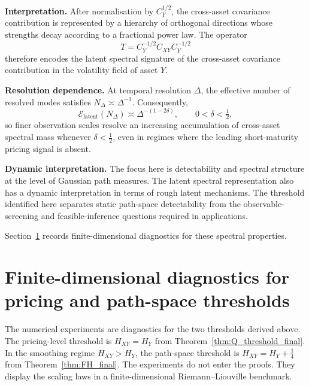 \documentclass[11pt,a4paper]{amsart}
\theoremstyle{plain}
\theoremstyle{definition}
\theoremstyle{remark}
\begin{document}
\medskip

\noindent
\textbf{Interpretation.}
After normalisation by $C_Y^{1/2}$, the cross-asset covariance contribution is represented by a hierarchy of orthogonal directions whose strengths decay according to a fractional power law. The operator
\[
T = C_Y^{-1/2} C_{XY} C_Y^{-1/2}
\]
therefore encodes the latent spectral signature of the cross-asset covariance contribution in the
volatility field of asset $Y$.

\medskip

\noindent
\textbf{Resolution dependence.}
At temporal resolution $\Delta$, the effective number of resolved modes satisfies $N_\Delta\asymp \Delta^{-1}$. Consequently,
\[
\mathcal E_{\mathrm{latent}}(N_\Delta)\asymp \Delta^{-(1-2\delta)},
\qquad 0<\delta<\tfrac12,
\]
so finer observation scales resolve an increasing accumulation of cross-asset spectral mass whenever
$\delta<\tfrac12$, even in regimes where the leading short-maturity pricing signal is absent.

\medskip

\noindent
\textbf{Dynamic interpretation.}
The focus here is detectability and spectral structure at the level of Gaussian path measures.
The latent spectral representation also has a dynamic interpretation in terms of rough latent
mechanisms.  The threshold identified here separates static path-space detectability from the
observable-screening and feasible-inference questions required in applications.

\medskip

Section~\ref{sec:numerics} records finite-dimensional diagnostics for these spectral properties.


\section{Finite-dimensional diagnostics for pricing and path-space thresholds}
\label{sec:numerics}

The numerical experiments are diagnostics for the two thresholds derived above.  The pricing-level
threshold is $H_{XY}=H_Y$ from Theorem~\ref{thm:Q_threshold_final}.  In the smoothing regime
$H_{XY}>H_Y$, the path-space threshold is $H_{XY}=H_Y+\tfrac14$ from
Theorem~\ref{thm:FH_final}.  The experiments do not enter the proofs.  They display the scaling
laws in a finite-dimensional Riemann--Liouville benchmark.
\end{document}
